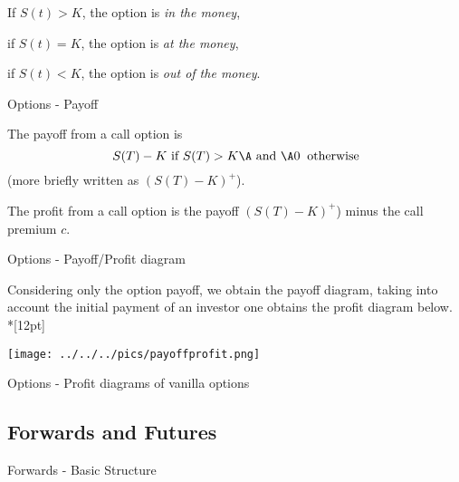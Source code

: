	If $S(t) > K$, the option is {\it in the money},


	if $S(t) = K$, the option is {\it at the money},


	if $S(t) < K$, the option is {\it out of the money}.





{Options - Payoff}







	The payoff from a call option is $$ S(T) - K \mbox{ if } S(T)
> K\A \mbox{ and }\A 0 \;\; \mbox{otherwise} $$ (more briefly
written as  $(S(T) - K)^+$).


	The profit from a call option is the payoff $(S(T) - K)^+$) minus the call premium $c$.





{Options - Payoff/Profit diagram }

Considering only the option payoff, we obtain the payoff diagram, taking into account the initial payment of an investor one obtains the profit diagram below.\\*[12pt]

\begin{center}
\texttt{[image: ../../../pics/payoffprofit.png]}
\end{center}

{Options - Profit diagrams of vanilla options}
\begin{figure}
  \centering
   \qquad
\end{figure}

\subsection{Forwards and Futures}

{Forwards - Basic Structure}








